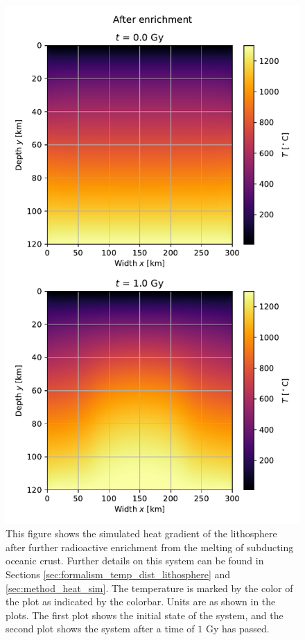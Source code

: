 \documentclass[reprint,english,notitlepage]{revtex4-1}  %
\begin{document}
\begin{figure}[H]
\centering
\includegraphics[width=\columnwidth]{../data/2D_heat_after.pdf}
\caption{This figure shows the simulated heat gradient of the lithosphere after further radioactive enrichment from the melting of subducting oceanic crust. Further details on this system can be found in Sections \ref{sec:formalism_temp_dist_lithosphere} and \ref{sec:method_heat_sim}. The temperature is marked by the color of the plot as indicated by the colorbar. Units are as shown in the plots. The first plot shows the initial state of the system, and the second plot shows the system after a time of $1$ Gy has passed.} \label{fig:lithosphere_after_enrichment}
\end{figure}
\end{document}
